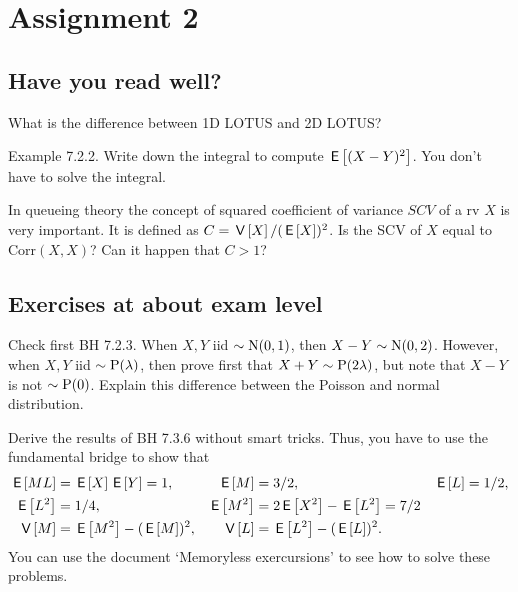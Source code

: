 \documentclass[assignments]{subfiles}
\begin{document}
\section{Assignment 2}


\subsection{Have you read well?}


\begin{exercise}
What is the difference between 1D LOTUS and 2D LOTUS?
\end{exercise}

\begin{exercise}
Example 7.2.2. Write down the integral to compute $\,\mathsf{E}\left[(X-Y)^{2}\right]$. You don't have to solve the integral.
\end{exercise}

\begin{exercise}
In queueing theory  the concept of squared coefficient of variance $SCV$ of a rv $X$ is very important. It is defined as $C = \,\mathsf{V}\left[X\right]/(\,\mathsf{E}\left[X\right])^{2}$. Is the SCV of $X$ equal to $\text{Corr}(X,X)$? Can it happen that $C>1$?
\end{exercise}


\subsection{Exercises at about exam level}
\label{sec:exercises-at-about}


\begin{exercise}
Check first BH 7.2.3.
When $X, Y$ iid $\sim \mathrm{N}(0, 1)$, then $X-Y\sim\mathrm{N}(0,2)$.
However, when $X, Y$ iid $\sim \mathrm{P}(\lambda)$, then prove first that $X+Y\sim \mathrm{P}(2\lambda)$, but note that $X-Y$ is not $\sim\mathrm{P}(0)$.
Explain this difference between the Poisson and normal distribution.
\end{exercise}


\begin{exercise}
Derive the results of BH 7.3.6 without smart tricks. Thus, you have to use the fundamental bridge to show that 
\begin{align*}
\,\mathsf{E}\left[M L\right] &= \,\mathsf{E}\left[X\right] \,\mathsf{E}\left[Y\right] = 1, & \,\mathsf{E}\left[M\right] &= 3/2, & \,\mathsf{E}\left[L\right] &= 1/2, \\
\,\mathsf{E}\left[L^{2}\right] &=  1/4, & \,\mathsf{E}\left[M^{2}\right] &= 2\,\mathsf{E}\left[X^{2}\right] - \,\mathsf{E}\left[L^{2}\right] = 7/2 \\ 
\,\mathsf{V}\left[M\right]&=\,\mathsf{E}\left[M^2\right] - (\,\mathsf{E}\left[M\right])^{2}, & \,\mathsf{V}\left[L\right] &= \,\mathsf{E}\left[L^2\right]-(\,\mathsf{E}\left[L\right])^2.
\end{align*}
You can use the document `Memoryless exercursions' to see how to solve these problems. 
\end{exercise}
\end{document}
